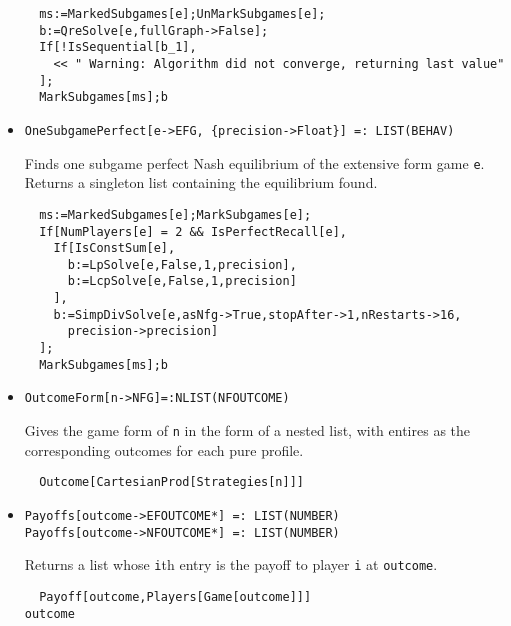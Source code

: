 \begin{itemize}
\begin{verbatim}
  ms:=MarkedSubgames[e];UnMarkSubgames[e];
  b:=QreSolve[e,fullGraph->False];
  If[!IsSequential[b_1],
    << " Warning: Algorithm did not converge, returning last value"
  ];
  MarkSubgames[ms];b
\end{verbatim} 
\ed

\item{}
\protect \large \begin{verbatim}
OneSubgamePerfect[e->EFG, {precision->Float}] =: LIST(BEHAV) 
\end{verbatim}\normalsize

\bd 
Finds one subgame perfect Nash equilibrium of the extensive form
game \verb+e+.  Returns a singleton list containing the equilibrium
found.

\begin{verbatim}
  ms:=MarkedSubgames[e];MarkSubgames[e];
  If[NumPlayers[e] = 2 && IsPerfectRecall[e],
    If[IsConstSum[e],
      b:=LpSolve[e,False,1,precision],
      b:=LcpSolve[e,False,1,precision]
    ],
    b:=SimpDivSolve[e,asNfg->True,stopAfter->1,nRestarts->16,
      precision->precision]
  ];
  MarkSubgames[ms];b
\end{verbatim} 
\ed

\item{}
\protect \large \begin{verbatim}
OutcomeForm[n->NFG]=:NLIST(NFOUTCOME)
\end{verbatim}\normalsize

\bd 
Gives the game form of \verb+n+ in the form of a nested list, with
entires as the corresponding outcomes for each pure profile. 

\begin{verbatim}
  Outcome[CartesianProd[Strategies[n]]]
\end{verbatim} 
\ed


\item{}
\protect \large \begin{verbatim}
Payoffs[outcome->EFOUTCOME*] =: LIST(NUMBER) 
Payoffs[outcome->NFOUTCOME*] =: LIST(NUMBER) 
\end{verbatim}\normalsize

\bd 
Returns a list whose \verb+i+th entry is the payoff to player \verb+i+
at \verb+outcome+.
\begin{verbatim}
  Payoff[outcome,Players[Game[outcome]]]
outcome
\end{verbatim} 
\ed


\end{itemize}
